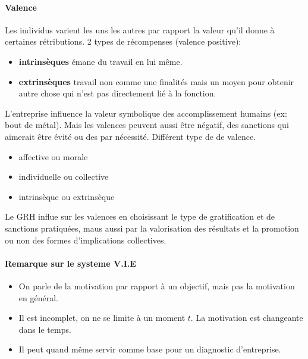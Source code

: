 \documentclass[11pt]{article} %
\begin{document}
		 \paragraph{Valence} Les individus varient les uns les autres par rapport la valeur qu'il donne à 
		 certaines rétributions. 2 types de récompenses (valence positive):
		 \begin{itemize}
		 	\item \textbf{intrinsèques} émane du travail en lui même.
		 	\item \textbf{extrinsèques} travail non comme une finalités mais un moyen pour obtenir autre 
		 	chose qui n'est pas directement lié à la fonction.
		 \end{itemize}
		 L'entreprise influence la valeur symbolique des accomplissement humains (ex: bout de métal). Mais les
		 valences peuvent aussi être négatif, des sanctions qui aimerait être évité ou des par nécessité. 
		 Différent type de de valence.
		 \begin{multicols}{2}
		 	\begin{itemize}
		 		\item affective ou morale
		 		\item individuelle ou collective
		 		\item intrinsèque ou extrinsèque
		 	\end{itemize}
		 \end{multicols}
		Le GRH influe sur les valences en choisissant le type de gratification et de sanctions pratiquées, maus aussi par la valorisation des résultats et la promotion ou non des formes d'implications collectives.
		 \paragraph{Remarque sur le systeme V.I.E}
		 \begin{itemize}
		 	\item On parle de la motivation par rapport à un objectif, mais pas la motivation en général.
		 	\item Il est incomplet, on ne se limite à un moment $t$. La motivation est changeante dans le temps.
		 	\item Il peut quand même servir comme base pour un diagnostic d'entreprise.
		 \end{itemize}
\end{document}
